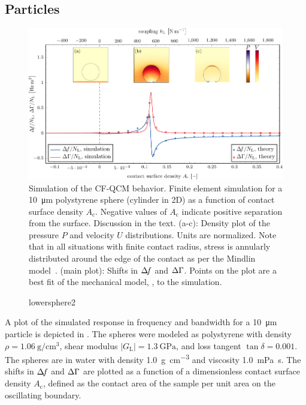 \subsection{Particles}
\begin{figure}[ht]
\centering
\includegraphics{qcm/figures/lowersphere.pdf}
\caption{%
Simulation of the CF-QCM behavior.
Finite element simulation for a \SI{10}{\micro\meter} polystyrene
sphere (cylinder in 2D) as a function of contact surface density 
$A_\mathrm{c}$.  Negative values of $A_\mathrm{c}$ indicate positive
separation from the surface.  Discussion in the text. (a-c): Density plot
of the pressure $P$ and velocity $U$ distributions. Units are normalized.
Note that in all situations with finite contact radius, 
stress is annularly distributed around the edge of the contact as per the
Mindlin model~\cite{kumacheva1998interfacial}.
(main plot): Shifts in $\Delta\!f$ and $\Delta\Gamma$.
Points on the plot are
a best fit of the mechanical model, , to the simulation.}
\label{fig:lowersphere}
\end{figure}


\begin{figure}
\centering
{lowersphere2}
\end{figure}

A plot of the simulated response in frequency and bandwidth for a
\SI{10}{\micro\meter} particle is depicted in .
The spheres were modeled as polystyrene with density
$\rho=\SI{1.06}{\gram\per\centi\meter\cubed}$, shear modulus
$|G_\mathrm{L}|=\SI{1.3}{\giga\pascal}$, and loss tangent $\tan \delta =
0.001$.  The spheres are in water with density
\SI{1.0}{\gram\per\centi\meter\cubed} and viscosity
\SI{1.0}{\milli\pascal\second}.  The shifts in $\Delta\!f$ and $\Delta\Gamma$ are plotted
as a function of a dimensionless contact surface density $A_\mathrm{c}$,
defined as the contact area of the sample per unit area on the oscillating
boundary. 

